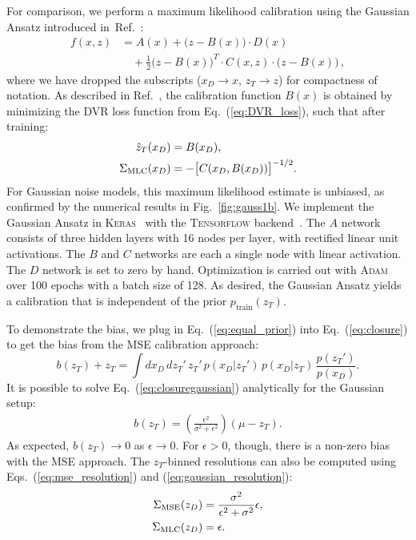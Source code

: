 \documentclass[aps,prd,reprint,preprintnumbers,superscriptaddress,nofootinbib,longbibliography,floatfix]{revtex4-1}
\DeclareRobustCommand{\Fig}[1]{Fig.~\ref{fig:#1}}
\DeclareRobustCommand{\Eq}[1]{Eq.~(\ref{eq:#1})}
\DeclareRobustCommand{\Eqs}[2]{Eqs.~(\ref{eq:#1}) and (\ref{eq:#2})}
\DeclareRobustCommand{\Ref}[1]{Ref.~\cite{#1}}
\begin{document}
For comparison, we perform a maximum likelihood calibration using the Gaussian Ansatz introduced in~\Ref{frequentstway}:
%
\begin{align}
    f(x,z) &= A(x) + \big(z-B(x)\big)\cdot D(x) \nonumber\\&\quad + \frac{1}{2} \big(z-B(x)\big)^T \cdot C(x,z) \cdot \big(z-B(x)\big)\,,
    \label{eq:gaussian_ansatz}
\end{align}
%
where we have dropped the subscripts ($x_D \to x$, $z_T \to z$) for compactness of notation.
%
As described in \Ref{frequentstway}, the calibration function $B(x)$ is obtained by minimizing the DVR loss function from \Eq{DVR_loss}, such that after training:
%
\begin{align}
    \hat{z}_T(x_D) &= B(x_D),\\
    \Sigma_{\rm MLC}(x_D) &= - \big[C(x_D,B(x_D))\big]^{-1/2}.
\end{align}
%
For Gaussian noise models, this maximum likelihood estimate is unbiased, as confirmed by the numerical results in \Fig{gauss1b}.
%
We implement the Gaussian Ansatz in \textsc{Keras}~\cite{keras} with the \textsc{Tensorflow} backend~\cite{tensorflow}.
%
The $A$ network consists of three hidden layers with 16 nodes per layer, with rectified linear unit activations.
%
The $B$ and $C$ networks are each a single node with linear activation.
%
The $D$ network is set to zero by hand.
%
Optimization is carried out with \textsc{Adam}~\cite{adam} over 100 epochs with a batch size of 128.
%
As desired, the Gaussian Ansatz yields a calibration that is independent of the prior $p_{\text{train}}(z_T)$.



To demonstrate the bias, we plug in \Eq{equal_prior} into \Eq{closure} to get the bias from the MSE calibration approach:
%
\begin{equation}
\label{eq:closuregaussian}
b(z_T) + z_T =\int dx_D\,dz_T'\,z_T'\,p(x_D|z_T')\, p(x_D|z_T)\,\frac{p(z_T')}{p(x_D)}.
\end{equation}
%
It is possible to solve \Eq{closuregaussian} analytically for the Gaussian setup:
%
\begin{align}
\label{eq:closuregaussian2}
b(z_T) = \left(\frac{\epsilon^2}{\sigma^2+\epsilon^2}\right)(\mu - z_T).
\end{align}
%
As expected, $b(z_T)\rightarrow 0$ as $\epsilon\rightarrow 0$.
%
For $\epsilon>0$, though, there is a non-zero bias with the MSE approach. 
%
The $z_T$-binned resolutions can also be computed using \Eqs{mse_resolution}{gaussian_resolution}:
%
\begin{align}
    \Sigma_{\rm MSE}(z_D) &= \frac{\sigma^2}{\epsilon^2 + \sigma^2} \epsilon, \\
    \Sigma_{\rm MLC}(z_D) &=  \epsilon.
\end{align}
\end{document}
